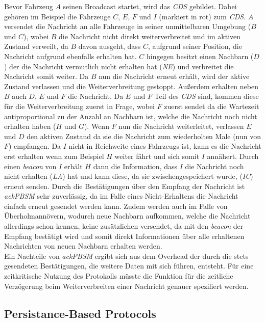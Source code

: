 \documentclass[english,runningheads,a4paper]{llncs}[2018/03/10]
\begin{document}
Bevor Fahrzeug $A$ seinen Broadcast startet, wird das \textit{CDS} gebildet.
Dabei gehören im Beispiel die Fahrzeuge $C$, $E$, $F$ und $I$ (markiert in rot) zum \textit{CDS}.
$A$ versendet die Nachricht an alle Fahrzeuge in seiner unmittelbaren Umgebung ($B$ und $C$), wobei $B$ die Nachricht nicht direkt weiterverbreitet und im aktiven Zustand verweilt, da $B$ davon ausgeht, dass $C$, aufgrund seiner Position, die Nachricht aufgrund ebenfalls erhalten hat.
$C$ hingegen besitzt einen Nachbarn ($D$) der die Nachricht vermutlich nicht erhalten hat (\textit{NE}) und verbreitet die Nachricht somit weiter.
Da $B$ nun die Nachricht erneut erhält, wird der aktive Zustand verlassen und die Weiterverbreitung gestoppt.
Außerdem erhalten neben $B$ auch $D$, $E$ und $F$ die Nachricht.
Da $E$ und $F$ Teil des \textit{CDS} sind, kommen diese für die Weiterverbreitung zuerst in Frage, wobei $F$ zuerst sendet da die Wartezeit antiproportional zu der Anzahl an Nachbarn ist, welche die Nachricht noch nicht erhalten haben ($H$ und $G$).
Wenn $F$ nun die Nachricht weiterleitet, verlassen $E$ und $D$ den aktiven Zustand da sie die Nachricht zum wiederholten Male (nun von $F$) empfangen.
Da $I$ nicht in Reichweite eines Fahrzeugs ist, kann es die Nachricht erst erhalten wenn zum Beispiel $H$ weiter fährt und sich somit $I$ annähert.
Durch einen \textit{beacon} von $I$ erhält $H$ dann die Information, dass $I$ die Nachricht noch nicht erhalten (\textit{LA}) hat und kann diese, da sie zwischengespeichert wurde, (\textit{IC}) erneut senden.
Durch die Bestätigungen über den Empfang der Nachricht ist \textit{ackPBSM} sehr zuverlässig, da im Falle eines Nicht-Erhaltens die Nachricht einfach erneut gesendet werden kann.
Zudem werden auch im Falle von Überholmannövern, wodurch neue Nachbarn aufkommen, welche die Nachricht allerdings schon kennen, keine zusätzlichen versendet, da mit den \textit{beacon} der Empfang bestätigt wird und somit direkt Informationen über alle erhaltenen Nachrichten von neuen Nachbarn erhalten werden.\\
Ein Nachteile von \textit{ackPBSM} ergibt sich aus dem Overhead der durch die stets gesendeten Bestätigungen, die weitere Daten mit sich führen, entsteht.
Für eine zeitkritische Nutzung des Protokolls müsste die Funktion für die zeitliche Verzögerung beim Weiterverbreiten einer Nachricht genauer spezifiert werden\cite{conti2013mobile}.


\subsection{Persistance-Based Protocols}
\end{document}
